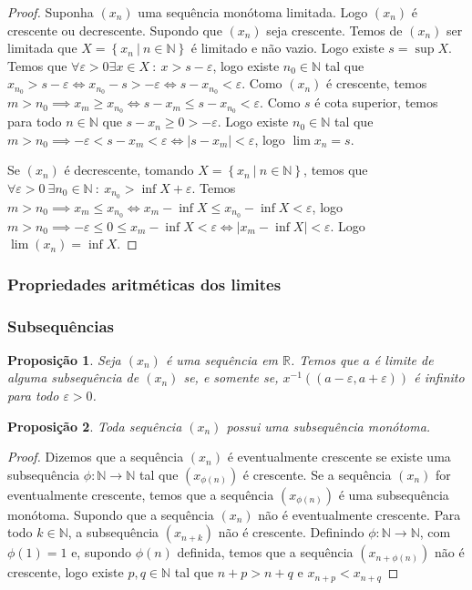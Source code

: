 \documentclass{article}
\newtheorem{prop}{Proposição}[section]
\theoremstyle{theorem}
\theoremstyle{lemma}
\theoremstyle{definition}
\theoremstyle{remark}
\begin{document}
\begin{proof}
	Suponha $(x_n)$ uma sequência monótoma limitada. Logo $(x_n)$ é crescente ou decrescente.
	Supondo que $(x_n)$ seja crescente. Temos de $(x_n)$ ser limitada que $X = \left\{ x_n \: | \: n\in \mathbb{N} \right\}$ é limitado e não vazio. Logo existe $s = \sup X$. Temos que $\forall \varepsilon>0 \exists x \in X \: : \: x > s - \varepsilon$, logo existe $n_0 \in \mathbb{N}$ tal que $x_{n_0} > s - \varepsilon \iff x_{n_0} -s > -\varepsilon \iff s - x_{n_0}< \varepsilon$. Como $(x_n)$ é crescente, temos $m > n_0 \implies x_m \geq x_{n_0} \iff s-x_{m} \leq s- x_{n_0} < \varepsilon$.  Como $s$ é cota superior, temos para todo $n\in \mathbb{N}$ que  $s - x_n \geq 0  > -\varepsilon$. Logo existe $n_0\in \mathbb{N}$ tal que $m > n_0 \implies -\varepsilon < s - x_m < \varepsilon \iff |s-x_m| < \varepsilon$, logo $\lim x_n = s$.

	Se $(x_n)$ é decrescente, tomando $X = \left\{x_n \: | \: n\in \mathbb{N}\right\}$,  temos que $\forall \varepsilon >0 \: \exists n_0\in \mathbb{N} \: : \: x_{n_0} > \inf X +\varepsilon$. Temos $m > n_0 \implies x_m \leq x_{n_0} \iff x_m - \inf X \leq x_{n_0} -\inf X < \varepsilon$, logo $m>n_0 \implies -\varepsilon \leq 0 \leq x_m - \inf X < \varepsilon \iff |x_m - \inf X | < \varepsilon$. Logo $\lim (x_n) = \inf X$.
\end{proof}
   \subsubsection{ Propriedades aritméticas dos limites}
   \subsubsection{ Subsequências}
\begin{prop}
	Seja $(x_n)$ é uma sequência em $\mathbb{R}$. Temos que $a$ é limite de alguma subsequência de $(x_n)$ se, e somente se, $x^{-1}((a-\varepsilon, a+\varepsilon))$ é infinito para todo $\varepsilon>0$.
\end{prop}
\begin{prop}
	Toda sequência $(x_n)$ possui uma subsequência monótoma.
\end{prop}
\begin{proof}
	Dizemos que a sequência $(x_n)$ é eventualmente crescente se existe uma subsequência $\phi:\mathbb{N} \to \mathbb{N}$ tal que $(x_{\phi(n)})$ é crescente. Se a sequência $(x_n)$ for eventualmente crescente, temos que a sequência $(x_{\phi(n)})$ é  uma subsequência monótoma.
	Supondo que a sequência $(x_n)$ não é eventualmente crescente.  Para todo $k\in \mathbb{N}$, a subsequência $(x_{n+k})$ não é crescente. Definindo $\phi: \mathbb{N} \to \mathbb{N}$, com $\phi(1) = 1$ e, supondo $\phi(n)$ definida, temos que a sequência $(x_{n+\phi(n)})$ não é crescente, logo existe $p,q\in \mathbb{N}$ tal que $n+p>n+q$ e $x_{n+p} < x_{n+q}$
\end{proof}
\end{document}
